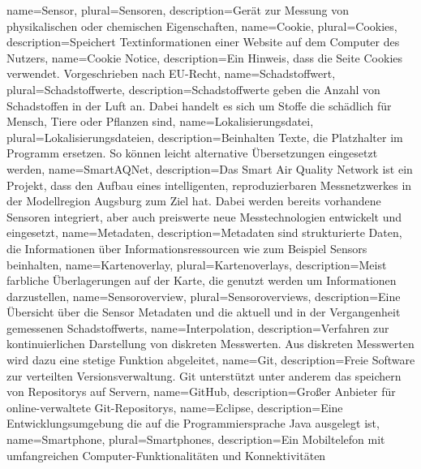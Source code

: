 \makenoidxglossaries
{}
{
	name=Sensor,
	plural=Sensoren,
	description={Gerät zur Messung von physikalischen oder chemischen Eigenschaften},
}
{
	name=Cookie,
	plural=Cookies,
	description={Speichert Textinformationen einer Website auf dem Computer des Nutzers},
}
{
	name=Cookie Notice,
	description={Ein Hinweis, dass die Seite Cookies verwendet. Vorgeschrieben nach EU-Recht},
}
{
	name=Schadstoffwert,
	plural=Schadstoffwerte,
	description={Schadstoffwerte geben die Anzahl von Schadstoffen in der Luft an. Dabei handelt es sich um Stoffe die schädlich für Mensch, Tiere oder Pflanzen sind},
}
{
	name=Lokalisierungsdatei,
	plural=Lokalisierungsdateien,
	description={Beinhalten Texte, die Platzhalter im Programm ersetzen. So können leicht alternative Übersetzungen eingesetzt werden},
}
{
	name=SmartAQNet,
	description={Das Smart Air Quality Network ist ein Projekt, dass den Aufbau eines intelligenten, reproduzierbaren Messnetzwerkes in der Modellregion Augsburg zum Ziel hat. Dabei werden bereits vorhandene Sensoren integriert, aber auch preiswerte neue Messtechnologien entwickelt und eingesetzt},
}
{
	name=Metadaten,
	description={Metadaten sind strukturierte Daten, die Informationen über Informationsressourcen wie zum Beispiel \glspl{Sensor} beinhalten},
}
{
	name=Kartenoverlay,
	plural=Kartenoverlays,
	description={Meist farbliche Überlagerungen auf der Karte, die genutzt werden um Informationen darzustellen},
}
{
	name=Sensoroverview,
	plural=Sensoroverviews,
	description={Eine Übersicht über die \gls{Sensor} \gls{Metadaten} und die aktuell und in der Vergangenheit gemessenen \glspl{Schadstoffwert}},
}
{
	name=Interpolation,
	description={Verfahren zur kontinuierlichen Darstellung von diskreten Messwerten. Aus diskreten Messwerten wird dazu eine stetige Funktion abgeleitet},
}
{
	name=Git,
	description={Freie Software zur verteilten Versionsverwaltung. Git unterstützt unter anderem das speichern von \glspl{Repository} auf Servern},
}
{
	name=GitHub,
	description={Großer Anbieter für online-verwaltete \gls{Git}-\glspl{Repository}},
}
{
	name=Eclipse,
	description={Eine Entwicklungsumgebung die auf die Programmiersprache Java ausgelegt ist},
}
{
	name=Smartphone,
	plural=Smartphones,
	description={Ein Mobiltelefon mit umfangreichen Computer-Funktionalitäten und Konnektivitäten}
}
